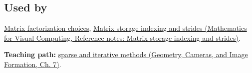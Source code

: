 \subsection{Used by}\label{appendix-67c87a3d9e94-used-by}

\hypertarget{appendix-67c87a3d9e94-used-by}{}

\hyperref[appendix-221a483bec2d]{Matrix factorization choices}, \href{../02-Mathematics-for-Visual-Computing/main.pdf\#nameddest=appendix-ffdc1d4e5350}{Matrix storage indexing and strides (Mathematics for Visual Computing, Reference notes: Matrix storage indexing and strides)}.

\textbf{Teaching path:} \href{../03-Geometry-Cameras-and-Image-Formation/main.pdf\#nameddest=02-foundations-ii-ch038-sparse-problems-change-the-economics-of-solving}{sparse and iterative methods (Geometry, Cameras, and Image Formation, Ch. 7)}.
